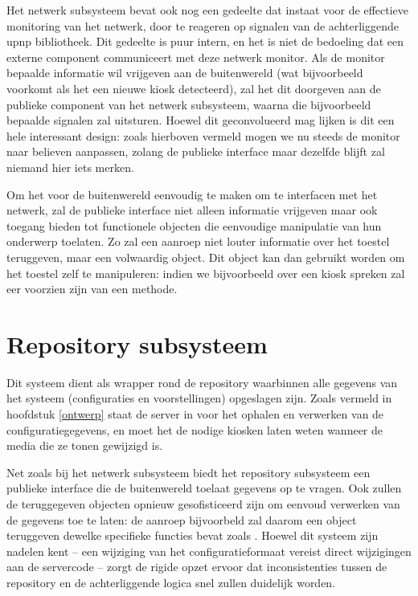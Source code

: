 Het netwerk subsysteem bevat ook nog een gedeelte dat instaat voor de effectieve monitoring van het netwerk, door te reageren op signalen van de achterliggende \ac{upnp} bibliotheek. Dit gedeelte is puur intern, en het is niet de bedoeling dat een externe component communiceert met deze netwerk monitor. Als de monitor bepaalde informatie wil vrijgeven aan de buitenwereld (wat bijvoorbeeld voorkomt als het een nieuwe kiosk detecteerd), zal het dit doorgeven aan de publieke component van het netwerk subsysteem, waarna die bijvoorbeeld bepaalde signalen zal uitsturen. Hoewel dit geconvolueerd mag lijken is dit een hele interessant design: zoals hierboven vermeld mogen we nu steeds de monitor naar believen aanpassen, zolang de publieke interface maar dezelfde blijft zal niemand hier iets merken.

Om het voor de buitenwereld eenvoudig te maken om te interfacen met het netwerk, zal de publieke interface niet alleen informatie vrijgeven maar ook toegang bieden tot functionele objecten die eenvoudige manipulatie van hun onderwerp toelaten. Zo zal een  aanroep niet louter informatie over het toestel teruggeven, maar een volwaardig  object. Dit object kan dan gebruikt worden om het toestel zelf te manipuleren: indien we bijvoorbeeld over een kiosk spreken zal eer voorzien zijn van een  methode.

\section{Repository subsysteem}
\label{server:structuur:repository}

Dit systeem dient als wrapper rond de repository waarbinnen alle gegevens van het systeem (configuraties en voorstellingen) opgeslagen zijn. Zoals vermeld in hoofdstuk \ref{ontwerp} staat de server in voor het ophalen en verwerken van de configuratiegegevens, en moet het de nodige kiosken laten weten wanneer de media die ze tonen gewijzigd is.

Net zoals bij het netwerk subsysteem biedt het repository subsysteem een publieke interface die de buitenwereld toelaat gegevens op te vragen. Ook zullen de teruggegeven objecten opnieuw gesofisticeerd zijn om eenvoud verwerken van de gegevens toe te laten: de  aanroep bijvoorbeld zal daarom een  object teruggeven dewelke specifieke functies bevat zoals . Hoewel dit systeem zijn nadelen kent -- een wijziging van het configuratieformaat vereist direct wijzigingen aan de servercode -- zorgt de rigide opzet ervoor dat inconsistenties tussen de repository en de achterliggende logica snel zullen duidelijk worden. 

